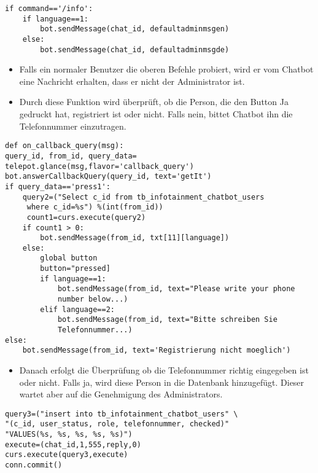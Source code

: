 \begin{lstlisting}[frame=single]
if command=='/info':
	if language==1:
		bot.sendMessage(chat_id, defaultadminmsgen)
	else:
		bot.sendMessage(chat_id, defaultadminmsgde)
\end{lstlisting}
\begin{itemize}
	\item Falls ein normaler Benutzer die oberen Befehle probiert, wird er vom Chatbot eine Nachricht erhalten, dass er nicht der Administrator ist.
\end{itemize}
\begin{itemize}
	\item Durch diese Funktion wird überprüft, ob die Person, die den Button Ja gedruckt hat, registriert ist oder nicht. Falls nein, bittet Chatbot ihn die Telefonnummer einzutragen.
\end{itemize}
\begin{lstlisting}[frame=single]
def on_callback_query(msg):
query_id, from_id, query_data=
telepot.glance(msg,flavor='callback_query')
bot.answerCallbackQuery(query_id, text='getIt')
if query_data=='press1':
	query2=("Select c_id from tb_infotainment_chatbot_users
	 where c_id=%s") %(int(from_id))
	 count1=curs.execute(query2)
	if count1 > 0:
		bot.sendMessage(from_id, txt[11][language])
	else:
		global button
		button="pressed]
		if language==1:
			bot.sendMessage(from_id, text="Please write your phone 
			number below...)
		elif language==2:
			bot.sendMessage(from_id, text="Bitte schreiben Sie 
			Telefonnummer...)
else:
	bot.sendMessage(from_id, text='Registrierung nicht moeglich')
\end{lstlisting}
\begin{itemize}
	\item Danach erfolgt die Überprüfung ob die Telefonnummer richtig eingegeben ist oder nicht. Falls ja, wird diese Person in die Datenbank hinzugefügt. Dieser wartet aber auf die Genehmigung des Administrators.
\end{itemize}
\begin{lstlisting}[frame=single] 
query3=("insert into tb_infotainment_chatbot_users" \
"(c_id, user_status, role, telefonnummer, checked)"
"VALUES(%s, %s, %s, %s, %s)")
execute=(chat_id,1,555,reply,0)
curs.execute(query3,execute)
conn.commit()
\end{lstlisting}

